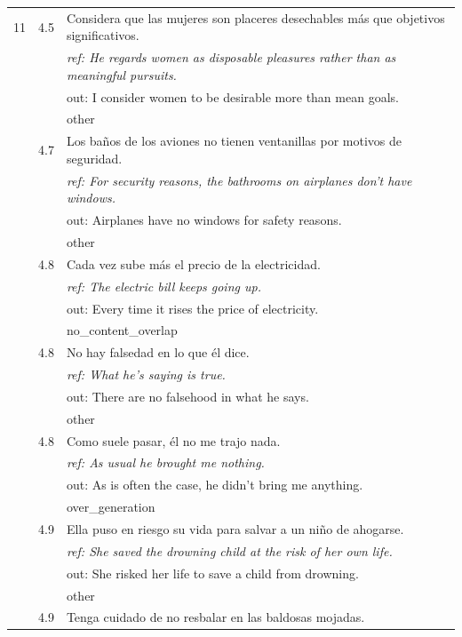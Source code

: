 \begin{longtable}{@{}rp{0.7cm}p{11cm}@{}}
11 & 4.5 & \small Considera que las mujeres son placeres desechables más que objetivos significativos. \\
& & \small\itshape ref: He regards women as disposable pleasures rather than as meaningful pursuits. \\
& & \small\ttfamily out: I consider women to be desirable more than mean goals. \\
& & \scriptsize other \\\addlinespace
12 & 4.7 & \small Los baños de los aviones no tienen ventanillas por motivos de seguridad. \\
& & \small\itshape ref: For security reasons, the bathrooms on airplanes don't have windows. \\
& & \small\ttfamily out: Airplanes have no windows for safety reasons. \\
& & \scriptsize other \\\addlinespace
13 & 4.8 & \small Cada vez sube más el precio de la electricidad. \\
& & \small\itshape ref: The electric bill keeps going up. \\
& & \small\ttfamily out: Every time it rises the price of electricity. \\
& & \scriptsize no\_content\_overlap \\\addlinespace
14 & 4.8 & \small No hay falsedad en lo que él dice. \\
& & \small\itshape ref: What he's saying is true. \\
& & \small\ttfamily out: There are no falsehood in what he says. \\
& & \scriptsize other \\\addlinespace
15 & 4.8 & \small Como suele pasar, él no me trajo nada. \\
& & \small\itshape ref: As usual he brought me nothing. \\
& & \small\ttfamily out: As is often the case, he didn't bring me anything. \\
& & \scriptsize over\_generation \\\addlinespace
16 & 4.9 & \small Ella puso en riesgo su vida para salvar a un niño de ahogarse. \\
& & \small\itshape ref: She saved the drowning child at the risk of her own life. \\
& & \small\ttfamily out: She risked her life to save a child from drowning. \\
& & \scriptsize other \\\addlinespace
17 & 4.9 & \small Tenga cuidado de no resbalar en las baldosas mojadas. \\

\end{longtable}
